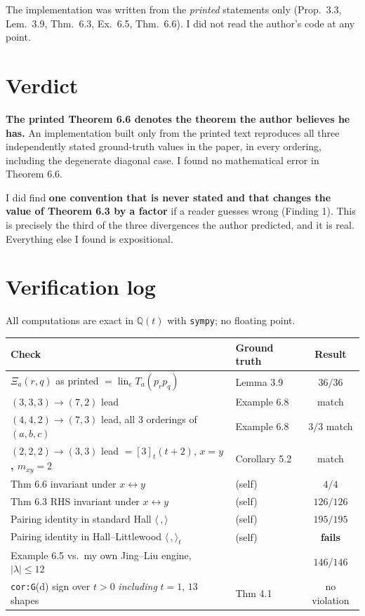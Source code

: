 \documentclass[11pt]{article}
\theoremstyle{definition}
\begin{document}
The implementation was written from the \emph{printed} statements only (Prop.~3.3,
Lem.~3.9, Thm.~6.3, Ex.~6.5, Thm.~6.6). I did not read the author's code at any point.

\section{Verdict}

\textbf{The printed Theorem 6.6 denotes the theorem the author believes he has.} An
implementation built only from the printed text reproduces all three independently stated
ground-truth values in the paper, in every ordering, including the degenerate diagonal case.
I found no mathematical error in Theorem 6.6.

I did find \textbf{one convention that is never stated and that changes the value of
Theorem 6.3 by a factor} if a reader guesses wrong (Finding 1). This is precisely the third
of the three divergences the author predicted, and it is real. Everything else I found is
expositional.

\section{Verification log}

All computations are exact in $\mathbb{Q}(t)$ with \texttt{sympy}; no floating point.

\begin{center}
\begin{tabular}{llc}
\toprule
Check & Ground truth & Result \\
\midrule
$\Xi_a(r,q)$ as printed $=\operatorname{lin}_e T_a(p_rp_q)$ & Lemma 3.9 & $36/36$ \\
$(3,3,3)\to(7,2)$ lead & Example 6.8 & match \\
$(4,4,2)\to(7,3)$ lead, all $3$ orderings of $(a,b,c)$ & Example 6.8 & $3/3$ match \\
$(2,2,2)\to(3,3)$ lead $=[3]_t(t+2)$, \textbf{$x=y$, $m_{xy}=2$} & Corollary 5.2 & match \\
Thm 6.6 invariant under $x\leftrightarrow y$ & (self) & $4/4$ \\
Thm 6.3 RHS invariant under $x\leftrightarrow y$ & (self) & $126/126$ \\
Pairing identity in standard Hall $\langle\,,\rangle$ & (self) & $195/195$ \\
Pairing identity in Hall--Littlewood $\langle\,,\rangle_t$ & (self) & \textbf{fails} \\
Example 6.5 vs.\ my own Jing--Liu engine, $|\lambda|\le12$ & \cite{JingLiu} & $146/146$ \\
\texttt{cor:G}(d) sign over $t>0$ \emph{including} $t=1$, $13$ shapes & Thm 4.1 & no violation \\
\bottomrule
\end{tabular}
\end{center}
\end{document}

